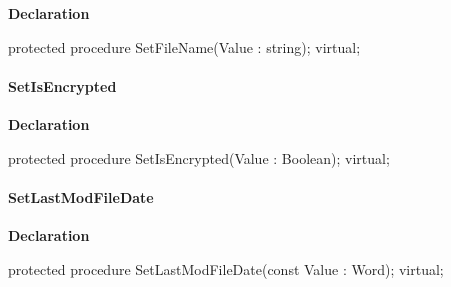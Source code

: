 \documentclass{report}
\newif\ifpdf
\begin{document}
\label{AbArcTyp.TAbArchiveItem-SetFileName}
\begin{list}{}{
\setlength{\itemindent}{0cm}
\setlength{\listparindent}{0cm}
\setlength{\leftmargin}{\evensidemargin}
\addtolength{\leftmargin}{\tmplength}
\settowidth{\labelsep}{X}
\addtolength{\leftmargin}{\labelsep}
\setlength{\labelwidth}{\tmplength}
}
\item[\textbf{Declaration}\hfill]
\ifpdf
\begin{flushleft}
\fi
\begin{ttfamily}
protected procedure SetFileName(Value : string); virtual;\end{ttfamily}

\ifpdf
\end{flushleft}
\fi

\end{list}
\paragraph*{SetIsEncrypted}\hspace*{\fill}

\label{AbArcTyp.TAbArchiveItem-SetIsEncrypted}
\begin{list}{}{
\setlength{\itemindent}{0cm}
\setlength{\listparindent}{0cm}
\setlength{\leftmargin}{\evensidemargin}
\addtolength{\leftmargin}{\tmplength}
\settowidth{\labelsep}{X}
\addtolength{\leftmargin}{\labelsep}
\setlength{\labelwidth}{\tmplength}
}
\item[\textbf{Declaration}\hfill]
\ifpdf
\begin{flushleft}
\fi
\begin{ttfamily}
protected procedure SetIsEncrypted(Value : Boolean); virtual;\end{ttfamily}

\ifpdf
\end{flushleft}
\fi

\end{list}
\paragraph*{SetLastModFileDate}\hspace*{\fill}

\label{AbArcTyp.TAbArchiveItem-SetLastModFileDate}
\begin{list}{}{
\setlength{\itemindent}{0cm}
\setlength{\listparindent}{0cm}
\setlength{\leftmargin}{\evensidemargin}
\addtolength{\leftmargin}{\tmplength}
\settowidth{\labelsep}{X}
\addtolength{\leftmargin}{\labelsep}
\setlength{\labelwidth}{\tmplength}
}
\item[\textbf{Declaration}\hfill]
\ifpdf
\begin{flushleft}
\fi
\begin{ttfamily}
protected procedure SetLastModFileDate(const Value : Word); virtual;\end{ttfamily}

\ifpdf
\end{flushleft}
\fi

\end{list}
\end{document}
